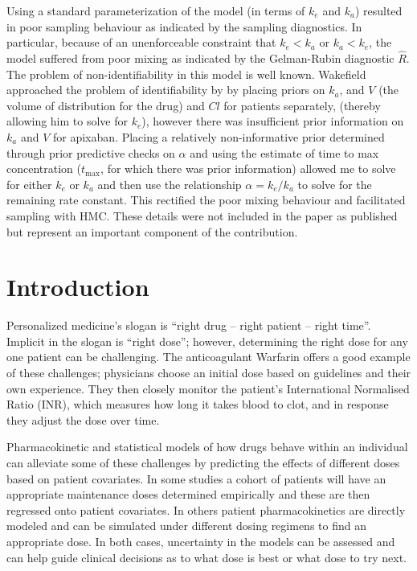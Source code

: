 Using a standard parameterization of the model (in terms of $k_e$ and $k_a$) resulted in poor sampling behaviour as indicated by the sampling diagnostics.  In particular, because of an unenforceable constraint that $k_e < k_a$ or $k_a < k_e$, the model suffered from poor mixing as indicated by the Gelman-Rubin diagnostic $\hat{R}$.  The problem of non-identifiability in this model is well known.  Wakefield approached the problem of identifiability by \cite{wakefield1992bayesian} by placing priors on $k_a$, and $V$ (the volume of distribution for the drug) and $Cl$ for patients separately, (thereby allowing him to solve for $k_e$), however there was insufficient prior information on $k_a$ and $V$ for apixaban.
Placing a relatively non-informative prior determined through prior predictive checks on $\alpha$ and using the estimate of time to max concentration ($t_{\max}$, for which there was prior information) allowed me to solve for either $k_e$ or $k_a$ and then use the relationship $\alpha = k_e / k_a$ to solve for the remaining rate constant.  This rectified the poor mixing behaviour and facilitated sampling with HMC.  These details were not included in the paper as published but represent an important component of the contribution.

\newpage


\section{Introduction}

Personalized medicine’s slogan is ``right drug -- right patient -- right time''.  Implicit in the slogan is ``right dose''; however, determining the right dose for any one patient can be challenging. The anticoagulant Warfarin offers a good example of these challenges; physicians choose an initial dose based on guidelines and their own experience. They then closely monitor the patient’s International Normalised Ratio (INR), which measures how long it takes blood to clot, and in response they adjust the dose over time.

Pharmacokinetic and statistical models of how drugs behave within an individual can alleviate some of these challenges by predicting the effects of different doses based on patient covariates. In some studies \cite{schwarz2008genetic,Sohrabi2017-zv, Caldwell2007-mi}  a cohort of patients will have an appropriate maintenance doses determined empirically and these are then regressed onto patient covariates.  In others \cite{ohara2019differences,Zhu2017-rk, Xue2017-mp}  patient pharmacokinetics are directly modeled and can be simulated under different dosing regimens to find an appropriate dose.  In both cases, uncertainty in the models can be assessed and can help guide clinical decisions as to what dose is best or what dose to try next.

